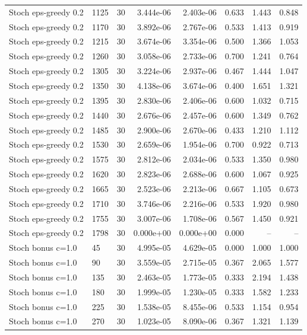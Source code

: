 \begin{scriptsize}
\begin{longtable}{llrrrrrr}
Stoch eps-greedy 0.2 & 1125 & 30 & 3.444e-06 & 2.403e-06 & 0.633 & 1.443 & 0.848 \\
Stoch eps-greedy 0.2 & 1170 & 30 & 3.892e-06 & 2.767e-06 & 0.533 & 1.413 & 0.919 \\
Stoch eps-greedy 0.2 & 1215 & 30 & 3.674e-06 & 3.354e-06 & 0.500 & 1.366 & 1.053 \\
Stoch eps-greedy 0.2 & 1260 & 30 & 3.058e-06 & 2.733e-06 & 0.700 & 1.241 & 0.764 \\
Stoch eps-greedy 0.2 & 1305 & 30 & 3.224e-06 & 2.937e-06 & 0.467 & 1.444 & 1.047 \\
Stoch eps-greedy 0.2 & 1350 & 30 & 4.138e-06 & 3.674e-06 & 0.400 & 1.651 & 1.321 \\
Stoch eps-greedy 0.2 & 1395 & 30 & 2.830e-06 & 2.406e-06 & 0.600 & 1.032 & 0.715 \\
Stoch eps-greedy 0.2 & 1440 & 30 & 2.676e-06 & 2.457e-06 & 0.600 & 1.349 & 0.762 \\
Stoch eps-greedy 0.2 & 1485 & 30 & 2.900e-06 & 2.670e-06 & 0.433 & 1.210 & 1.112 \\
Stoch eps-greedy 0.2 & 1530 & 30 & 2.659e-06 & 1.954e-06 & 0.700 & 0.922 & 0.713 \\
Stoch eps-greedy 0.2 & 1575 & 30 & 2.812e-06 & 2.034e-06 & 0.533 & 1.350 & 0.980 \\
Stoch eps-greedy 0.2 & 1620 & 30 & 2.823e-06 & 2.688e-06 & 0.600 & 1.067 & 0.925 \\
Stoch eps-greedy 0.2 & 1665 & 30 & 2.523e-06 & 2.213e-06 & 0.667 & 1.105 & 0.673 \\
Stoch eps-greedy 0.2 & 1710 & 30 & 3.746e-06 & 2.216e-06 & 0.533 & 1.920 & 0.980 \\
Stoch eps-greedy 0.2 & 1755 & 30 & 3.007e-06 & 1.708e-06 & 0.567 & 1.450 & 0.921 \\
Stoch eps-greedy 0.2 & 1798 & 30 & 0.000e+00 & 0.000e+00 & 0.000 & -- & -- \\
Stoch bonus c=1.0 & 45 & 30 & 4.995e-05 & 4.629e-05 & 0.000 & 1.000 & 1.000 \\
Stoch bonus c=1.0 & 90 & 30 & 3.559e-05 & 2.715e-05 & 0.367 & 2.065 & 1.577 \\
Stoch bonus c=1.0 & 135 & 30 & 2.463e-05 & 1.773e-05 & 0.333 & 2.194 & 1.438 \\
Stoch bonus c=1.0 & 180 & 30 & 1.999e-05 & 1.230e-05 & 0.333 & 1.582 & 1.233 \\
Stoch bonus c=1.0 & 225 & 30 & 1.538e-05 & 8.455e-06 & 0.533 & 1.154 & 0.954 \\
Stoch bonus c=1.0 & 270 & 30 & 1.023e-05 & 8.090e-06 & 0.367 & 1.321 & 1.139 \\

\end{longtable}
\end{scriptsize}
